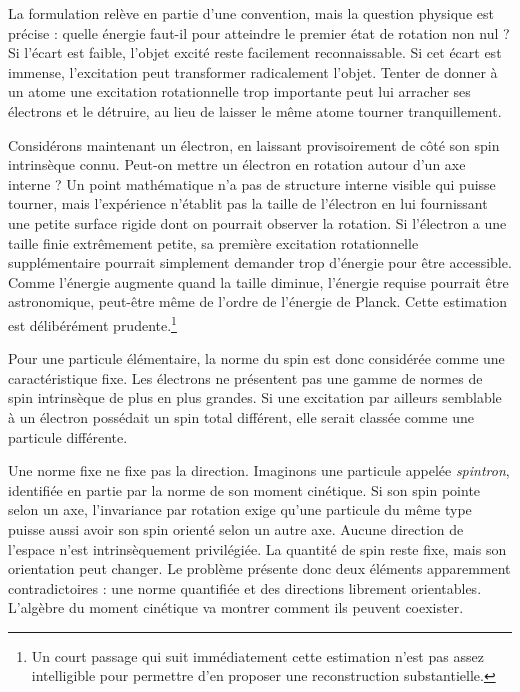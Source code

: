 La formulation relève en partie d’une convention, mais la question physique est précise : quelle énergie faut-il pour atteindre le premier état de rotation non nul ? Si l’écart est faible, l’objet excité reste facilement reconnaissable. Si cet écart est immense, l’excitation peut transformer radicalement l’objet. Tenter de donner à un atome une excitation rotationnelle trop importante peut lui arracher ses électrons et le détruire, au lieu de laisser le même atome tourner tranquillement.

Considérons maintenant un électron, en laissant provisoirement de côté son spin intrinsèque connu. Peut-on mettre un électron en rotation autour d’un axe interne ? Un point mathématique n’a pas de structure interne visible qui puisse tourner, mais l’expérience n’établit pas la taille de l’électron en lui fournissant une petite surface rigide dont on pourrait observer la rotation. Si l’électron a une taille finie extrêmement petite, sa première excitation rotationnelle supplémentaire pourrait simplement demander trop d’énergie pour être accessible. Comme l’énergie augmente quand la taille diminue, l’énergie requise pourrait être astronomique, peut-être même de l’ordre de l’énergie de Planck. Cette estimation est délibérément prudente.\footnote{Un court passage qui suit immédiatement cette estimation n’est pas assez intelligible pour permettre d’en proposer une reconstruction substantielle.}

Pour une particule élémentaire, la norme du spin est donc considérée comme une caractéristique fixe. Les électrons ne présentent pas une gamme de normes de spin intrinsèque de plus en plus grandes. Si une excitation par ailleurs semblable à un électron possédait un spin total différent, elle serait classée comme une particule différente.

Une norme fixe ne fixe pas la direction. Imaginons une particule appelée \emph{spintron}, identifiée en partie par la norme de son moment cinétique. Si son spin pointe selon un axe, l’invariance par rotation exige qu’une particule du même type puisse aussi avoir son spin orienté selon un autre axe. Aucune direction de l’espace n’est intrinsèquement privilégiée. La quantité de spin reste fixe, mais son orientation peut changer. Le problème présente donc deux éléments apparemment contradictoires : une norme quantifiée et des directions librement orientables. L’algèbre du moment cinétique va montrer comment ils peuvent coexister.

